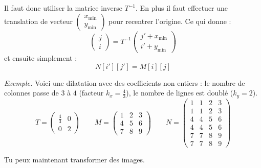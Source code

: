 \documentclass[11pt,class=report,crop=false]{standalone}
\begin{document}
\begin{activite}
\begin{enumerate}
 		
 	Il faut donc utiliser la matrice inverse $T^{-1}$. En plus il faut effectuer une translation de vecteur
 	$\left(\begin{smallmatrix}x_{\min}\\y_{\min}\end{smallmatrix}\right)$ pour recentrer l'origine.	
 	Ce qui donne :
 	$$\begin{pmatrix}j\\i\end{pmatrix} = T^{-1}  \begin{pmatrix}j'+x_{\min}\\i'+y_{\min}\end{pmatrix}$$
 	et ensuite simplement :
 	$$N[i'][j'] = M[i][j]$$
 	
 	\emph{Exemple.} Voici une dilatation avec des coefficients non entiers : le nombre de colonnes passe de $3$ à $4$ (facteur $k_x = \frac43$), le nombre de lignes est doublé ($k_y=2$).  
 	$$T = \begin{pmatrix}\frac43&0\\0&2\end{pmatrix}\qquad
 	M = \begin{pmatrix}
 	 1 & 2 & 3 \\
 	4 & 5 & 6 \\
 	7 & 8 & 9 \end{pmatrix}\qquad
 	N = \begin{pmatrix}
 	1 & 1 & 2 & 3 \\ 
 	1 & 1 & 2 & 3 \\ 
 	4 & 4 & 5 & 6 \\ 
 	4 & 4 & 5 & 6 \\ 
 	7 & 7 & 8 & 9 \\ 
 	7 & 7 & 8 & 9 
 	\end{pmatrix}$$
 		
\end{enumerate}

Tu peux maintenant transformer des images.
	
\end{activite}
\end{document}
